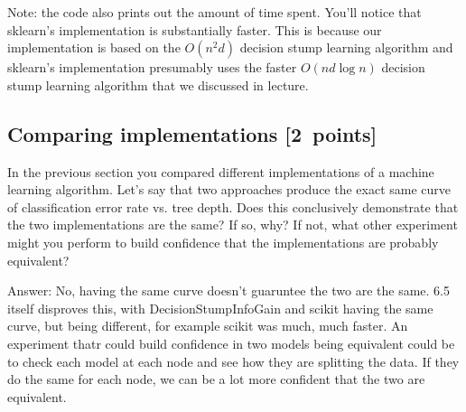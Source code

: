 \documentclass{article}
\newenvironment{answer}{\par\begingroup\color{gre}Answer: }{\endgroup}
\newcommand\pts[1]{\textcolor{pointscolour}{[#1~points]}}
\begin{document}
  Note: the code also prints out the amount of time spent. You'll notice that sklearn's implementation is substantially faster. This is because
  our implementation is based on the $O(n^2d)$ decision stump learning algorithm and sklearn's implementation presumably uses the faster $O(nd\log n)$
  decision stump learning algorithm that we discussed in lecture.

  \subsection{Comparing implementations \pts{2}}

  In the previous section you compared different implementations of a machine learning algorithm. Let's say that two
  approaches produce the exact same curve of classification error rate vs. tree depth. Does this conclusively demonstrate
  that the two implementations are the same? If so, why? If not, what other experiment might you perform to build confidence
  that the implementations are probably equivalent?

  \begin{answer}
    No, having the same curve doesn't guaruntee the two are the same. 6.5 itself disproves this, with DecisionStumpInfoGain and scikit having the same curve, but being different, for example scikit was much, much faster. An experiment thatr could build confidence in two models being equivalent could be to check each model at each node and see how they are splitting the data. If they do the same for each node, we can be a lot more confident that the two are equivalent.   
  \end{answer}
\end{document}
